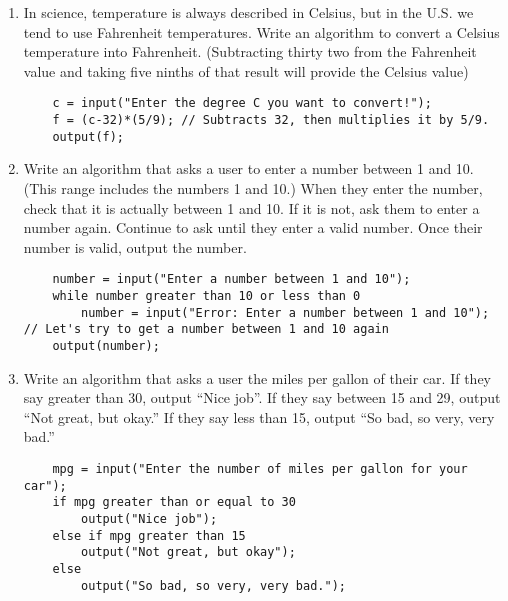 \documentclass{article}
\begin{document}
\begin{enumerate}
	\item In science, temperature is always described in Celsius, but in the U.S. we tend to use Fahrenheit temperatures. Write an algorithm to convert a Celsius temperature into Fahrenheit. (Subtracting thirty ­two from the Fahrenheit value and taking five ninths of that result will provide the Celsius value)
\begin{lstlisting}
	c = input("Enter the degree C you want to convert!");
	f = (c-32)*(5/9); // Subtracts 32, then multiplies it by 5/9.
	output(f);
\end{lstlisting}

	\item Write an algorithm that asks a user to enter a number between 1 and 10. (This range includes the numbers 1 and 10.) When they enter the number, check that it is actually between 1 and 10. If it is not, ask them to enter a number again. Continue to ask until they enter a valid number. Once their number is valid, output the number.
	
\begin{lstlisting}
	number = input("Enter a number between 1 and 10");
	while number greater than 10 or less than 0
		number = input("Error: Enter a number between 1 and 10"); // Let's try to get a number between 1 and 10 again
	output(number);
\end{lstlisting}

	\item Write an algorithm that asks a user the miles per gallon of their car. If they say greater than 30, output “Nice job”. If they say between 15 and 29, output “Not great, but okay.” If they say less than 15, output “So bad, so very, very bad.”

\begin{lstlisting}
	mpg = input("Enter the number of miles per gallon for your car");
	if mpg greater than or equal to 30
		output("Nice job");
	else if mpg greater than 15
		output("Not great, but okay");
	else 
		output("So bad, so very, very bad.");
\end{lstlisting}


\end{enumerate}
\end{document}
